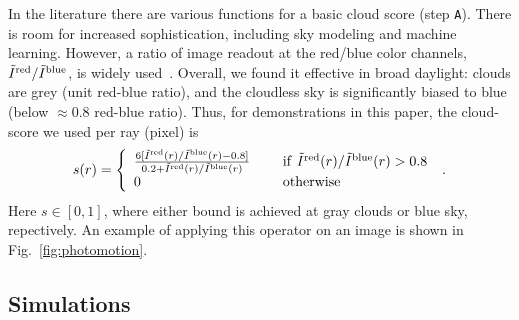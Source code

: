 \documentclass[runningheads]{llncs}
\begin{document}
In the literature there are various functions for a basic cloud score (step {\tt A}). There is room for increased sophistication, including sky modeling and machine learning. However,
a ratio of image readout at the red/blue color channels, $\tilde I^{\rm red}/\tilde I^{\rm blue}$, is widely used~\cite{Seiz2002,Yamashita2004}. Overall, we found it effective in broad daylight: clouds are grey (unit red-blue ratio), and the cloudless sky is significantly biased to blue
(below $\approx 0.8$ red-blue ratio). Thus, for demonstrations in this paper,
the cloud-score we used per ray (pixel) is
\begin{equation}
 s(r)=\left\{
      \begin{array}{ll}
      \frac{6 [\tilde I^{\rm red}(r)/\tilde I^{\rm blue}(r)-0.8]}
           {0.2+\tilde I^{\rm red}(r)/\tilde I^{\rm blue}(r)}
      & ~~~~{\rm if}~ \tilde I^{\rm red}(r)/\tilde I^{\rm blue}(r)>0.8 \\
      0
      & ~~~~{\rm otherwise}
      \end{array}
      \right.
  \;.
 \label{eq:sr}
\end{equation}
Here $s\in[0,1]$, where either bound is achieved at gray clouds or blue sky, repectively. An example of applying this operator on an image is shown in Fig.~\ref{fig:photomotion}.



\subsection*{Simulations}
\label{sec:simulation}
\end{document}
